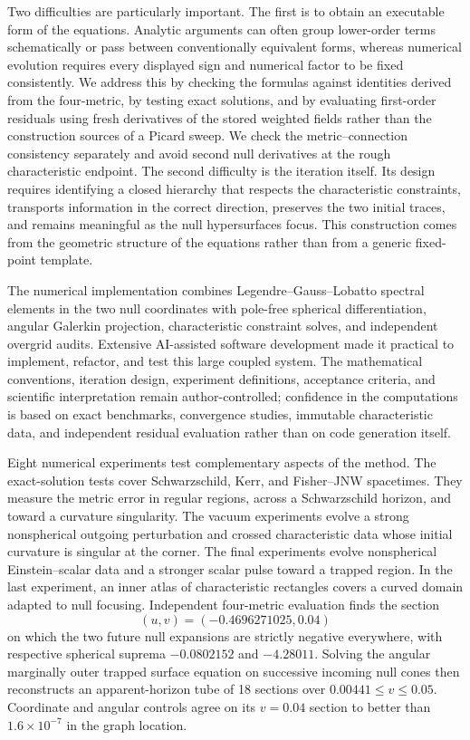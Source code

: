 Two difficulties are particularly important.  The first is to obtain an
executable form of the equations.  Analytic arguments can often group
lower-order terms schematically or pass between conventionally equivalent
forms, whereas numerical evolution requires every displayed sign and
numerical factor to be fixed consistently.  We address this by checking the
formulas against identities derived from the four-metric, by testing exact
solutions, and by evaluating first-order residuals using fresh derivatives
of the stored weighted fields rather than the construction sources of a
Picard sweep.  We check the metric--connection consistency separately and
avoid second null derivatives at the rough characteristic endpoint.  The second difficulty is the
iteration itself.  Its design requires identifying a closed hierarchy that
respects the characteristic constraints, transports information in the
correct direction, preserves the two initial traces, and remains meaningful
as the null hypersurfaces focus.  This construction comes from the geometric
structure of the equations rather than from a generic fixed-point template.

The numerical implementation combines Legendre--Gauss--Lobatto spectral
elements in the two null coordinates with pole-free spherical
differentiation, angular Galerkin projection, characteristic constraint
solves, and independent overgrid audits.  Extensive AI-assisted software
development made it practical to implement, refactor, and test this large
coupled system.  The mathematical conventions, iteration design, experiment
definitions, acceptance criteria, and scientific interpretation remain
author-controlled; confidence in the computations is based on exact
benchmarks, convergence studies, immutable characteristic data, and
independent residual evaluation rather than on code generation itself.

Eight numerical experiments test complementary aspects of the method.  The
exact-solution tests cover Schwarzschild, Kerr, and Fisher--JNW spacetimes.
They measure the metric error in regular regions, across a Schwarzschild
horizon, and toward a curvature singularity.  The vacuum experiments evolve a
strong nonspherical outgoing perturbation and crossed characteristic data
whose initial curvature is singular at the corner.  The final experiments
evolve nonspherical Einstein--scalar data and a stronger scalar pulse toward
a trapped region.  In the last experiment, an inner atlas of characteristic
rectangles covers a curved domain adapted to null focusing.  Independent
four-metric evaluation finds the section
\begin{equation}\label{eq:introduction-trapped-section}
  (u,v)=(-0.4696271025,0.04)
\end{equation}
on which the two future null expansions are strictly negative everywhere,
with respective spherical suprema $-0.0802152$ and $-4.28011$.  Solving the
angular marginally outer trapped surface equation on successive incoming
null cones then reconstructs an apparent-horizon tube of 18 sections over
$0.00441\leq v\leq0.05$.  Coordinate and angular controls agree on its
$v=0.04$ section to better than $1.6\times10^{-7}$ in the graph location.

